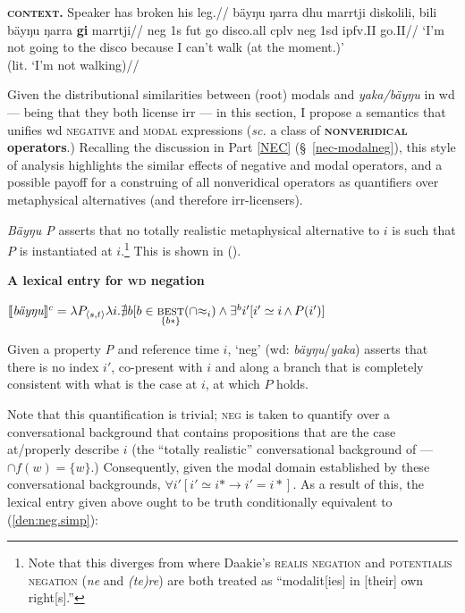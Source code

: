 \pex\begingl\glpreamble\textbf{\textsc{context.}} Speaker has broken his leg.//
\gla bäyŋu ŋarra dhu marrtji diskolili, bili bäyŋu ŋarra \textbf{gi} marrtji//
\glb \gls{neg} 1s \gls{fut} go disco.\gls{all} \gls{cplv} \gls{neg} 1sd \gls{ipfv}.\gls{II} go.\gls{II}//
\glft`I'm not going to the disco because I can't walk (at the moment.)'\\
(lit. `I'm not walking)\trailingcitation{[MG~20180802]}//\endgl\xe





Given the distributional similarities between (root) modals and \textit{yaka/bäyŋu} in \gls{wd} --- being that they both license \gls{irr} --- 
 in this section, I propose a semantics that unifies \gls{wd} \textsc{negative} and \textsc{modal} expressions (\textit{sc.} a class of \textbf{\textsc{nonveridical} operators}.)
Recalling the discussion in Part \ref{NEC} (\S~\ref{nec-modalneg}), this style of analysis highlights the similar effects of negative and modal operators, and a possible payoff for a construing of all nonveridical operators as quantifiers over metaphysical alternatives (and therefore \gls{irr}-licensers). 

\textit{Bäyŋu P} asserts that no totally realistic metaphysical alternative to $ i $ is such that $ P$ is instantiated at $ i $.\footnote{Note that this diverges from \citet{Krifka2015,Krifka2016} where Daakie's \textsc{realis negation} and \textsc{potentialis negation} (\textit{ne} and \textit{\textit{(te)re}}) are both treated as ``modalit[ies] in [their] own right[s].''} This is shown in (\nextx).

\pex \textbf{A lexical entry for \textsc{wd} negation}\noexno

\a $ \denote[c]{\textit{bäyŋu}} = \lambda P_{\langle s,t\rangle}\lambda i. \nexists b[b\in\underset{\{b*\}}{\textsc{best}}(\cap{\approx_i})\wedge\exists^b i'[i'\simeq i\mathop\wedge P(i')] $\par\nobreak

Given a property \textit{P} and reference time $ i $, `\gls{neg}' (\gls{wd}: \textit{bäyŋu}/\textit{yaka}) asserts that there is no index $ i' $, co-present with $ i $ and along a branch that is completely consistent with what is the case at $ i $, at which $ P $ holds.\xe

\noindent Note that this quantification is trivial; \textsc{neg} is taken to quantify over a conversational background that contains propositions that are the case at/properly describe $ i $ (the ``totally realistic'' conversational background of \citet[295]{Kratzer1981} --- $ {\cap f(w)=\{w\}} $.) Consequently, given the modal domain established by these conversational backgrounds, $ \forall i'[i'\simeq i*\to i'=i*] $. As a result of this, the lexical entry given above ought to be truth conditionally equivalent to (\ref{den:neg.simp}):

